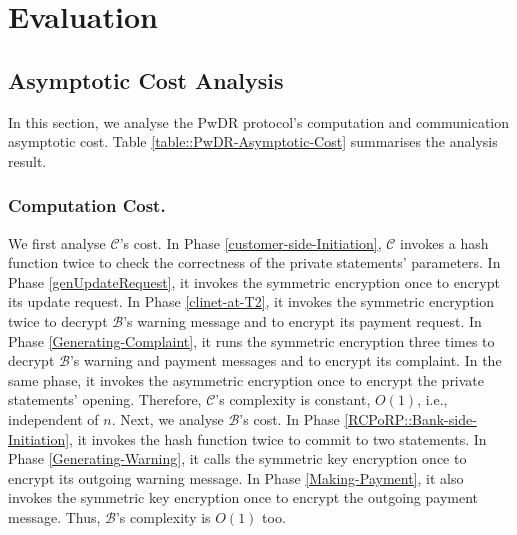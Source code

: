 \section{Evaluation}\label{sec::eval}





\subsection{Asymptotic Cost Analysis} In this section, we analyse the PwDR protocol's computation and communication asymptotic cost. Table \ref{table::PwDR-Asymptotic-Cost} summarises the analysis result.  





%

\vspace{-6mm}

\subsubsection{Computation Cost.}  We first analyse $\mathcal{C}$'s cost. In Phase \ref{customer-side-Initiation}, $\mathcal{C}$ invokes a hash function twice to check the correctness of the private statements' parameters. In Phase \ref{genUpdateRequest}, it invokes the symmetric encryption once to encrypt its update request. In Phase \ref{clinet-at-T2}, it invokes the symmetric encryption twice to decrypt $\mathcal{B}$'s warning message and to encrypt its payment request. In Phase \ref{Generating-Complaint}, it runs the symmetric encryption three times to decrypt $\mathcal{B}$'s warning and payment messages and to encrypt its complaint. In the same phase, it invokes the asymmetric encryption once to encrypt the private statements' opening. Therefore, $\mathcal{C}$'s complexity   is  constant, $O(1)$, i.e.,  independent of $n$.  Next, we analyse $\mathcal{B}$'s cost. In Phase \ref{RCPoRP::Bank-side-Initiation}, it invokes the hash function twice to commit to two statements. In Phase \ref{Generating-Warning}, it calls the symmetric key encryption once to encrypt its outgoing warning message. In Phase \ref{Making-Payment}, it also invokes the symmetric key encryption once to encrypt the outgoing payment message. Thus, $\mathcal{B}$'s complexity is  $O(1)$ too. 

